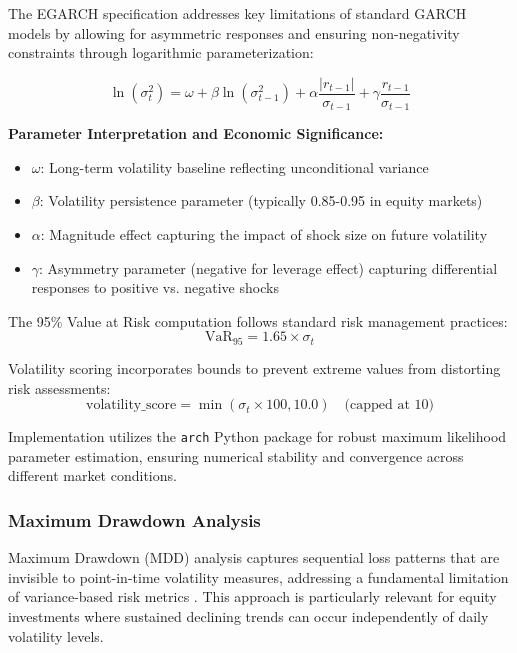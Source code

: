 \documentclass[3p,times,procedia]{elsarticle}
\begin{document}
The EGARCH specification addresses key limitations of standard GARCH models by allowing for asymmetric responses and ensuring non-negativity constraints through logarithmic parameterization:

\begin{equation}
\ln(\sigma_t^2) = \omega + \beta \ln(\sigma_{t-1}^2) + \alpha \frac{|r_{t-1}|}{\sigma_{t-1}} + \gamma \frac{r_{t-1}}{\sigma_{t-1}}
\end{equation}

\textbf{Parameter Interpretation and Economic Significance:}
\begin{itemize}
    \item $\omega$: Long-term volatility baseline reflecting unconditional variance
    \item $\beta$: Volatility persistence parameter (typically 0.85-0.95 in equity markets) \cite{Bollerslev1986}
    \item $\alpha$: Magnitude effect capturing the impact of shock size on future volatility
    \item $\gamma$: Asymmetry parameter (negative for leverage effect) capturing differential responses to positive vs. negative shocks \cite{Black1976}
\end{itemize}

The 95\% Value at Risk computation follows standard risk management practices:
\begin{equation}
\text{VaR}_{95} = 1.65 \times \sigma_t
\end{equation}

Volatility scoring incorporates bounds to prevent extreme values from distorting risk assessments:
\begin{equation}
\text{volatility\_score} = \min(\sigma_t \times 100, 10.0) \quad \text{(capped at 10)}
\end{equation}

Implementation utilizes the \texttt{arch} Python package for robust maximum likelihood parameter estimation, ensuring numerical stability and convergence across different market conditions.

\subsubsection{{Maximum Drawdown Analysis}}

Maximum Drawdown (MDD) analysis captures sequential loss patterns that are invisible to point-in-time volatility measures, addressing a fundamental limitation of variance-based risk metrics \cite{Jorion2001}. This approach is particularly relevant for equity investments where sustained declining trends can occur independently of daily volatility levels.
\end{document}
